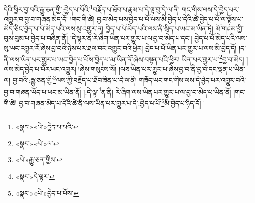 དེའི་ཕྱིར་བྱ་བའི་རྒྱུ་ཅན་གྱི་:བྱེད་པ་པོའི་\footnote{«སྣར་»«པེ་»བྱེད་པ་པའི་}བརྗོད་པ་ཐོབ་པ་རྣམ་པ་དེ་ལྟ་བུ་དེ་ལ་ནི། གང་གིས་ལས་དེ་བྱེད་པར་འགྱུར་བ་བྱ་བ་གཞན་མེད་དོ། །གང་གི་ཚེ། བྱ་བ་མེད་པས་བྱེད་པ་པོ་ལས་མི་བྱེད་པ་དེའི་ཚེ་བྱེད་པ་པོ་ལ་ལྟོས་པ་མེད་ཅིང་བྱེད་པ་པོ་མེད་པའི་ལས་སུ་འགྱུར་ན། བྱེད་པ་པོ་མེད་པའི་ལས་ནི་སྲིད་པ་ཡང་མ་ཡིན་ཏེ། མོ་གཤམ་གྱི་བུས་བུམ་པ་བྱེད་པ་བཞིན་ནོ། །དེ་ལྟར་ན་རེ་ཞིག་ཡིན་པར་གྱུར་པ་ལ་བྱ་བ་མེད་པ་དང་། བྱེད་པ་པོ་མེད་པའི་ལས་སུ་ཡང་འགྱུར་རོ་ཞེས་བྱ་བའི་ཉེས་པར་ཐལ་བར་འགྱུར་བའི་ཕྱིར། བྱེད་པ་པོ་ཡིན་པར་གྱུར་པ་ལས་མི་བྱེད་དོ། །ད་ནི་ལས་ཡིན་པར་གྱུར་པ་ཡང་བྱེད་པ་པོས་བྱེད་པ་མ་ཡིན་ནོ་ཞེས་བསྟན་པའི་ཕྱིར། ཡིན་པར་གྱུར་པ་\footnote{«སྣར་»«པེ་»ལ་}བྱ་བ་མེད། །ལས་མེད་བྱེད་པ་པོར་ཡང་འགྱུར། །ཞེས་གསུངས་སོ། །ལས་ཡིན་པར་གྱུར་པ་ཞེས་བྱ་བ་ནི་བྱ་བ་དང་ལྡན་པ་ཡིན་ལ། བྱ་བའི་:རྒྱུ་ཅན་གྱི་\footnote{«པེ་»རྒྱུ་ཅན་གྱིས་}ལས་ཀྱི་བརྗོད་པ་ཐོབ་ཟིན་པ་དེ་ལ་ནི། གཟོད་ཡང་གང་གིས་ལས་དེ་བྱེད་པར་འགྱུར་བའི་བྱ་བ་གཞན་ཡོད་པ་ཡང་མ་ཡིན་ནོ། །:དེ་ལྟ་\footnote{«སྣར་»དེ་ལྟར་}ན་ནི། རེ་ཞིག་ལས་ཡིན་པར་གྱུར་པ་ལ་བྱ་བ་མེད་པ་ཡིན་ནོ། །གང་གི་ཚེ། བྱ་བ་གཞན་མེད་པ་དེའི་ཚེ་ནི་ལས་ཡིན་པར་གྱུར་པ་དེ་:བྱེད་པ་པོ་\footnote{«སྣར་»«པེ་»བྱེད་པ་པོས་}མི་བྱེད་པ་ཉིད་དོ། །
